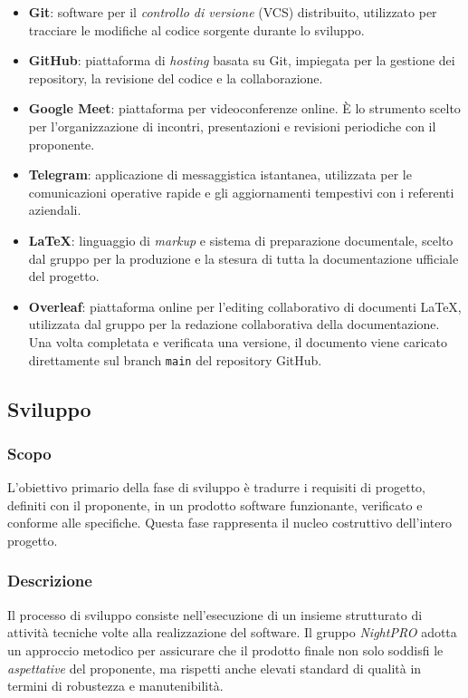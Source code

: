 \documentclass[a4paper, 11pt, oneside]{scrartcl} %
\begin{document}
\begin{itemize}
    \item \textbf{Git}: software per il \textit{controllo di versione} (VCS) distribuito, utilizzato per tracciare le modifiche al codice sorgente durante lo sviluppo.
    
    \item \textbf{GitHub}: piattaforma di \textit{hosting} basata su Git, impiegata per la gestione dei repository, la revisione del codice e la collaborazione.
    
    \item \textbf{Google Meet}: piattaforma per videoconferenze online. È lo strumento scelto per l'organizzazione di incontri, presentazioni e revisioni periodiche con il proponente.
    
    \item \textbf{Telegram}: applicazione di messaggistica istantanea, utilizzata per le comunicazioni operative rapide e gli aggiornamenti tempestivi con i referenti aziendali.
    
    \item \textbf{\LaTeX}: linguaggio di \textit{markup} e sistema di preparazione documentale, scelto dal gruppo per la produzione e la stesura di tutta la documentazione ufficiale del progetto.
    
    \item \textbf{Overleaf}: piattaforma online per l'editing collaborativo di documenti \LaTeX{}, utilizzata dal gruppo per la redazione collaborativa della documentazione. Una volta completata e verificata una versione, il documento viene caricato direttamente sul branch \texttt{main} del repository GitHub.
\end{itemize}

\subsection{Sviluppo}

\subsubsection{Scopo}
L'obiettivo primario della fase di sviluppo è tradurre i requisiti di progetto, definiti con il proponente, in un prodotto software funzionante, verificato e conforme alle specifiche. Questa fase rappresenta il nucleo costruttivo dell'intero progetto.

\subsubsection{Descrizione}
Il processo di sviluppo consiste nell'esecuzione di un insieme strutturato di attività tecniche volte alla realizzazione del software. 
Il gruppo \textit{NightPRO} adotta un approccio metodico per assicurare che il prodotto finale non solo soddisfi le \textit{aspettative} del proponente, ma rispetti anche elevati standard di qualità in termini di robustezza e manutenibilità.
\end{document}
